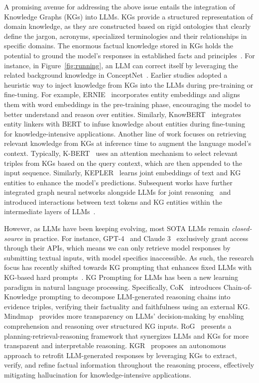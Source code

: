 \documentclass{article}
\theoremstyle{boldremark}
\begin{document}
A promising avenue for addressing the above issue entails the integration of Knowledge Graphs (KGs) into LLMs. 
KGs provide a structured representation of domain knowledge, as they are constructed based on rigid ontologies that clearly define the jargon, acronyms, specialized terminologies and their relationships in specific domains.
The enormous factual knowledge stored in KGs holds the potential to ground the model's responses in established facts and principles~\cite{hu2023survey,yang2024give,pan2024unifying}. 
For instance, in Figure~\ref{fig:running}, an LLM can correct itself by leveraging the related background knowledge in ConceptNet~\cite{speer2017conceptnet}. Earlier studies adopted a heuristic way to inject knowledge from KGs into the LLMs during pre-training or fine-tuning. For example, ERNIE~\cite{sun2021ernie} incorporates entity embeddings and aligns them with word embeddings in the pre-training phase, encouraging the model to better understand and reason over entities. Similarly, KnowBERT~\cite{peters2019knowledge} integrates entity linkers with BERT to infuse knowledge about entities during fine-tuning for knowledge-intensive applications.  
Another line of work focuses on retrieving relevant knowledge from KGs at inference time to augment the language model's context. Typically, K-BERT~\cite{liu2020k} uses an attention mechanism to select relevant triples from KGs based on the query context, which are then appended to the input sequence. Similarly, KEPLER~\cite{wang2021kepler} learns joint embeddings of text and KG entities to enhance the model's predictions.  Subsequent works have further integrated graph neural networks alongside LLMs for joint reasoning~\cite{QA-GNN,GreaseLM,dong2023hierarchy} and introduced interactions between text tokens and KG entities within the intermediate layers of LLMs~\cite{sun2021jointlk,taunk2023grapeqa}.

However, as LLMs have been keeping evolving, most SOTA LLMs remain \emph{closed-source} in practice. For instance, GPT-4~\cite{openai2023gpt4} and Claude 3~\cite{anthropic2024claude} exclusively grant access through their APIs, which means we can only retrieve model responses by submitting textual inputs, with model specifics inaccessible. As such, the research focus has recently shifted towards KG prompting that enhances fixed LLMs with KG-based hard prompts~\cite{liu2023pre,pan2024unifying}. 
KG Prompting for LLMs has been a new learning paradigm in natural language processing. Specifically, CoK~\cite{wang2023boosting} introduces Chain-of-Knowledge prompting to decompose LLM-generated reasoning chains into evidence triples, verifying their factuality and faithfulness using an external KG. 
Mindmap~\cite{wen2023mindmap} provides more transparency on LLMs' decision-making by enabling comprehension and reasoning over structured KG inputs. RoG~\cite{luo2023reasoning} presents a planning-retrieval-reasoning framework that synergizes LLMs and KGs for more transparent and interpretable reasoning. KGR~\cite{guan2024mitigating} proposes an autonomous approach to retrofit LLM-generated responses by leveraging KGs to extract, verify, and refine factual information throughout the reasoning process, effectively mitigating hallucination for knowledge-intensive applications.
\end{document}

